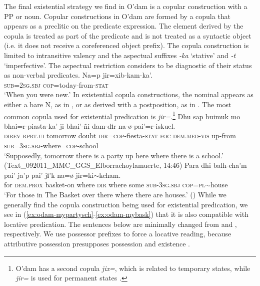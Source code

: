 \documentclass[output=paper,draft,draftmode,colorlinks,citecolor=brown]{langscibook}
\begin{document}
The final existential strategy we find in O’dam is a copular construction with a PP or noun. Copular constructions in O'dam are formed by a copula that appears as a preclitic on the predicate expression. The element derived by the copula is treated as part of the predicate and is not treated as a syntactic object (i.e. it does not receive a coreferenced object prefix). The copula construction is limited to intransitive valency and the aspectual suffixes \emph{-ka} `stative' and \emph{-t} `imperfective'. The aspectual restriction \citet[88ff]{garcia2014} considers to be diagnostic of their status as non-verbal predicates.
\ea
\label{ex:odam-copconst}
\gll Na=p jir={\ob}xib-kam{\cb}-ka'.\\
\textsc{sub=2sg.sbj} \textsc{cop}=today-from-\textsc{stat}\\
\glt `When you were new.' \citep[89]{garcia2014}
\z
In existential copula constructions, the nominal appears as either a bare N, as in , or as derived with a postposition, as in . The most common copula used for existential predication is \emph{jir=}.\footnote{O’dam has a second copula \emph{jix=}, which is related to temporary states, while \emph{jir=} is used for permanent states \citep{martinez2016}.}
\ea
\label{ex:odam-partysch}
\gll Dhu 		sap 		buimuk 	mo 	bhai=r-piasta-ka’ ji 	bhai’-ñi 	dam-dɨr 		na-\o-pai’=r-iskuel.\\
\textsc{direv} 	\textsc{rprt.ui} 	tomorrow 	doubt 	\textsc{dir=cop}-fiesta-\textsc{stat} \textsc{foc} 	\textsc{dem.med-vis} 	up-from		\textsc{sub=3sg.sbj}-where=\textsc{cop}-school\\
\glt ‘Supposedly, tomorrow there is a party up here where there is a school.’ (Text\_092011\_MMC\_GGS\_Elborrachoylamuerte, 14:46)
\z 
\ea
\label{ex:odam-thebask}
\gll Para 	dhi 	balh-cha'm     		pai'  	ja'p 	pai'    	jɨ'k 	{na=\o}	{jir=ki$\sim$kcham}.\\
	for  	\textsc{dem.prox} 	basket-on 	where 	\textsc{dir} 	where  some 	\textsc{sub-3sg.sbj} 	\textsc{cop=pl}$\sim$house\\
\glt ‘For those in The Basket over there where there are houses.’ (\citealt{garciaeinrev})
\z 
While we generally find the copula construction being used for existential predication, we see in (\ref{ex:odam-mypartysch}-\ref{ex:odam-mybask}) that it is also compatible with locative predication. The sentences below are minimally changed from  and , respectively. We use possessor prefixes to force a locative reading, because attributive possession presupposes possession and existence \citep{mithun2001}.
\end{document}
